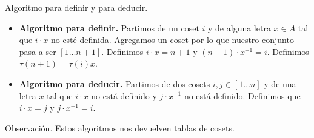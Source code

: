 \documentclass[aspectratio=169, 9pt]{beamer}
\newcommand{\rep}{\textsc{rep}}
\newcommand{\In}{[1 \dots n]}
\newcommand{\Co}{{\cal{C}}}
\begin{document}
\begin{frame}[fragile]{Algoritmo para definir y para deducir.}
	\begin{itemize}
		\item \textbf{Algoritmo para definir.} 
		Partimos de un coset $i$ y de alguna letra $x \in A$ tal que $i \cdot x$ no esté definida.
		Agregamos un coset por lo que nuestro conjunto pasa a ser $[1 \dots n+1]$. 
		Definimos $i \cdot x = n+1$ y $(n+1) \cdot x^{-1} = i$.
		Definimos $\tau(n+1) = \tau (i) x$.
		\pause
		\item \textbf{Algoritmo para deducir.} Partimos de dos cosets $i,j \in \In$ y de una letra $x$ tal que $i \cdot x$ no está definido y $j \cdot x^{-1}$ no está definido.
		Definimos que $i \cdot x = j$ y $j \cdot x^{-1} = i$.
	\end{itemize}
	
	
	\pause
	\begin{alertblock}{Observación.}
		Estos algoritmos nos devuelven tablas de cosets.
	\end{alertblock}
\end{frame}






%	
%	
%	
%
%
%		
\end{document}
